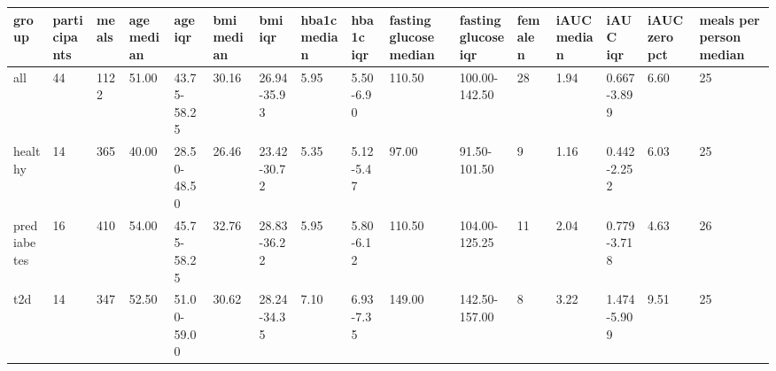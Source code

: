 {\footnotesize\setlength{\tabcolsep}{3pt}
\begin{longtable}{llllllllllllllll}
\toprule
\textbf{group} & \textbf{participants} & \textbf{meals} & \textbf{age median} & \textbf{age iqr} & \textbf{bmi median} & \textbf{bmi iqr} & \textbf{hba1c median} & \textbf{hba1c iqr} & \textbf{fasting glucose median} & \textbf{fasting glucose iqr} & \textbf{female n} & \textbf{iAUC median} & \textbf{iAUC iqr} & \textbf{iAUC zero pct} & \textbf{meals per person median} \\
\midrule
\endhead
all & 44 & 1122 & 51.00 & 43.75-58.25 & 30.16 & 26.94-35.93 & 5.95 & 5.50-6.90 & 110.50 & 100.00-142.50 & 28 & 1.94 & 0.667-3.899 & 6.60 & 25 \\
healthy & 14 & 365 & 40.00 & 28.50-48.50 & 26.46 & 23.42-30.72 & 5.35 & 5.12-5.47 & 97.00 & 91.50-101.50 & 9 & 1.16 & 0.442-2.252 & 6.03 & 25 \\
prediabetes & 16 & 410 & 54.00 & 45.75-58.25 & 32.76 & 28.83-36.22 & 5.95 & 5.80-6.12 & 110.50 & 104.00-125.25 & 11 & 2.04 & 0.779-3.718 & 4.63 & 26 \\
t2d & 14 & 347 & 52.50 & 51.00-59.00 & 30.62 & 28.24-34.35 & 7.10 & 6.93-7.35 & 149.00 & 142.50-157.00 & 8 & 3.22 & 1.474-5.909 & 9.51 & 25 \\
\bottomrule
\end{longtable}}
